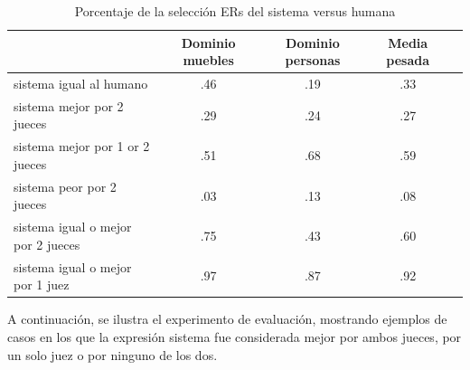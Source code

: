 \begin{table}[h!]
\begin{center}
\begin{tabular}{|l|c|c|c|c|}
\hline
 & Dominio muebles & Dominio personas & Media pesada \\
\hline
sistema igual al humano  	&	.46	&	.19	&	.33 \\
sistema mejor por 2 jueces &	.29 	& 	.24 	& 	.27 \\
sistema mejor por 1 or 2 jueces & .51	&	.68	&	.59 \\
sistema peor por 2 jueces &	.03	&	.13	&	.08 \\
sistema igual o mejor por 2 jueces  &.75  &       .43	&       .60 \\
sistema igual o mejor por 1 juez  &.97	&	.87	&	.92 \\
\hline
\end{tabular}
\caption{Porcentaje de la selecci\'on ERs del sistema versus humana} 
\label{system-versus-human}
\vspace*{-.5cm}
\end{center}
\end{table}



A continuaci\'on, se ilustra el experimento de evaluaci\'on, mostrando ejemplos de casos en los que la expresi\'on sistema fue considerada mejor por ambos jueces, por un solo juez o por ninguno de los dos.\\

